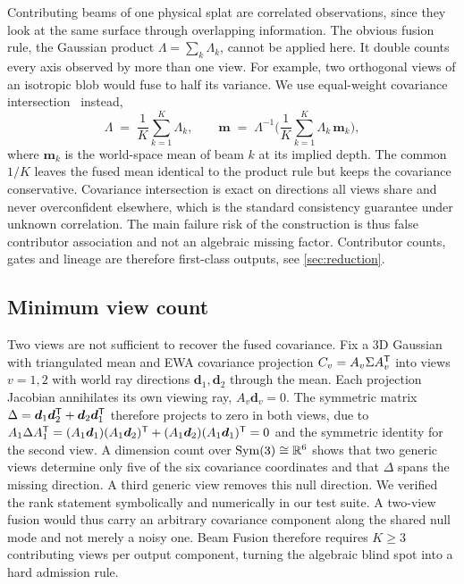Contributing beams of one physical splat are correlated observations, since they look at
the same surface through overlapping information.  The obvious fusion rule, the Gaussian
product $\Lambda = \sum_k \Lambda_k$, cannot be applied here.  It double counts every axis
observed by more than one view.  For example, two orthogonal views of an isotropic blob
would fuse to half its variance.  We use equal-weight covariance
intersection~\citep{julier1997_ci} instead,
\begin{equation}
  \Lambda \;=\; \frac{1}{K} \sum_{k=1}^{K} \Lambda_k,
  \qquad
  \bm{m} \;=\; \Lambda^{-1} \Big( \frac{1}{K} \sum_{k=1}^{K} \Lambda_k\, \bm{m}_k \Big),
  \label{eq:ci}
\end{equation}
where $\bm{m}_k$ is the world-space mean of beam $k$ at its implied depth.  The common
$1/K$ leaves the fused mean identical to the product rule but keeps the covariance
conservative.  Covariance intersection is exact on directions all views share and never
overconfident elsewhere, which is the standard consistency guarantee under unknown
correlation.  The main failure risk of the construction is thus false contributor
association and not an algebraic missing factor.  Contributor counts, gates and lineage
are therefore first-class outputs, see \cref{sec:reduction}.

\subsection{Minimum view count}
\label{sec:observability}

Two views are not sufficient to recover the fused covariance.  Fix a 3D Gaussian with
triangulated mean and EWA covariance projection $C_v = A_v \Sigma A_v^{\mathsf{T}}$ into views
$v = 1, 2$ with world ray directions $\bm{d}_1, \bm{d}_2$ through the mean.  Each
projection Jacobian annihilates its own viewing ray, $A_v \bm{d}_v = 0$.  The symmetric
matrix $\Delta = \bm{d}_1 \bm{d}_2^{\mathsf{T}} + \bm{d}_2 \bm{d}_1^{\mathsf{T}}$ therefore projects to zero in
both views, due to
$A_1 \Delta A_1^{\mathsf{T}} = (A_1\bm{d}_1)(A_1\bm{d}_2)^{\mathsf{T}} + (A_1\bm{d}_2)(A_1\bm{d}_1)^{\mathsf{T}} = 0$ and
the symmetric identity for the second view.  A dimension count over
$\operatorname{Sym}(3) \cong \mathbb{R}^6$ shows that two generic views determine only five of the six
covariance coordinates and that $\Delta$ spans the missing direction.  A third generic
view removes this null direction.  We verified the rank statement symbolically and
numerically in our test suite.  A two-view fusion would thus carry an arbitrary
covariance component along the shared null mode and not merely a noisy one.  Beam Fusion
therefore requires $K \ge 3$ contributing views per output component, turning the
algebraic blind spot into a hard admission rule.

